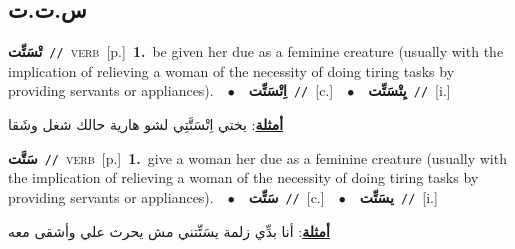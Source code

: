 \documentclass[10pt,a4paper,twoside]{article} %
\begin{document}
\begin{multicols}{2}
\vspace{-3mm}
\subsection*{\color{blue}\foreignlanguage{arabic}{س.ت.ت}\color{blue}{}} 

{\setlength\topsep{0pt}\textbf{\foreignlanguage{arabic}{تْسَتِّت}}\ {\color{gray}\texttt{//}\color{black}}\ \textsc{verb}\ [p.]\ \textbf{1.}~be given her due as a feminine creature (usually with the implication of relieving a woman of the necessity of doing tiring tasks by providing servants or appliances).\ \ $\bullet$\ \ \setlength\topsep{0pt}\textbf{\foreignlanguage{arabic}{اِتْسَتِّت}}\ {\color{gray}\texttt{//}\color{black}}\ [c.]\ \ $\bullet$\ \ \setlength\topsep{0pt}\textbf{\foreignlanguage{arabic}{يِتْسَتِّت}}\ {\color{gray}\texttt{//}\color{black}}\ [i.]\  \begin{flushright}\color{gray}\foreignlanguage{arabic}{\textbf{\underline{\foreignlanguage{arabic}{أمثلة}}}: يختي اِتْسَتَّتِي لشو هارية حالك شغل وشَقا}\end{flushright}\color{black}} \vspace{2mm}

{\setlength\topsep{0pt}\textbf{\foreignlanguage{arabic}{سَتَّت}}\ {\color{gray}\texttt{//}\color{black}}\ \textsc{verb}\ [p.]\ \textbf{1.}~give a woman her due as a feminine creature (usually with the implication of relieving a woman of the necessity of doing tiring tasks by providing servants or appliances).\ \ $\bullet$\ \ \setlength\topsep{0pt}\textbf{\foreignlanguage{arabic}{سَتِّت}}\ {\color{gray}\texttt{//}\color{black}}\ [c.]\ \ $\bullet$\ \ \setlength\topsep{0pt}\textbf{\foreignlanguage{arabic}{يسَتِّت}}\ {\color{gray}\texttt{//}\color{black}}\ [i.]\  \begin{flushright}\color{gray}\foreignlanguage{arabic}{\textbf{\underline{\foreignlanguage{arabic}{أمثلة}}}: أنا بدِّي زلمة يسَتِّتني مش يحرث علي وأشقى معه}\end{flushright}\color{black}} \vspace{2mm}


\end{multicols}
\end{document}
